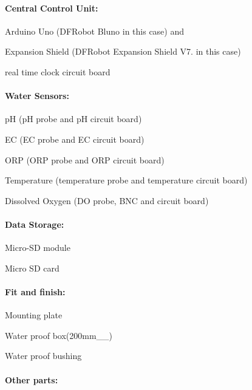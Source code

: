 \paragraph*{Central Control Unit\+:}


\begin{DoxyItemize}
\item Arduino Uno (D\+F\+Robot Bluno in this case) and
\item Expansion Shield (D\+F\+Robot Expansion Shield V7. in this case)
\item real time clock circuit board \paragraph*{Water Sensors\+:}
\end{DoxyItemize}


\begin{DoxyItemize}
\item pH (pH probe and pH circuit board)
\item EC (EC probe and EC circuit board)
\item O\+RP (O\+RP probe and O\+RP circuit board)
\item Temperature (temperature probe and temperature circuit board)
\item Dissolved Oxygen (DO probe, B\+NC and circuit board) \paragraph*{Data Storage\+:}
\end{DoxyItemize}


\begin{DoxyItemize}
\item Micro-\/\+SD module
\item Micro SD card \paragraph*{Fit and finish\+:}
\end{DoxyItemize}


\begin{DoxyItemize}
\item Mounting plate
\item Water proof box(200mm\+\_\+150mm\+\_\+75mm)
\item Water proof bushing \paragraph*{Other parts\+:}
\end{DoxyItemize}



